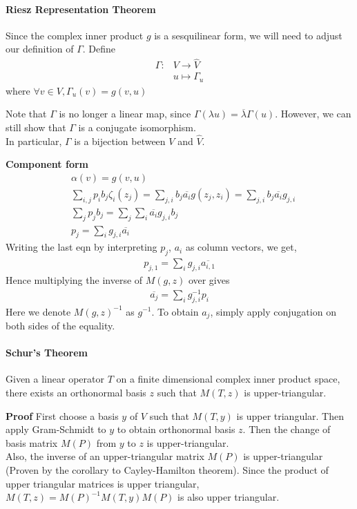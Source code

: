 \documentclass{article}
\begin{document}
\paragraph{Riesz Representation Theorem}
Since the complex inner product $g$ is a sesquilinear form, we will need to adjust our definition of $\Gamma$.
Define 
\begin{align*}
	\Gamma: &V\rightarrow \hat{V}\\
	&u\mapsto \Gamma_u
\end{align*}
where $\forall v\in V, \Gamma_u(v) = g(v, u)$

Note that $\Gamma$ is no longer a linear map, since $\Gamma(\lambda u) = \overline{\lambda}\Gamma(u)$.
However, we can still show that $\Gamma$ is a conjugate isomorphism.\\
In particular, $\Gamma$ is a bijection between $V$ and $\hat{V}$.

\textbf{Component form}
\begin{align*}
	&\alpha(v) = g(v,u)\\
	&\sum_{i,j}p_ib_j\zeta_i(z_j)=\sum_{j,i}b_j\overline{a_i}g(z_j,z_i)=\sum_{j,i}b_j\overline{a_i}g_{j,i}\\
	&\sum_j p_jb_j = \sum_j\sum_i \overline{a_i}g_{j,i} b_j\\
	&p_j = \sum_i g_{j,i}\overline{a_i}
\end{align*}
Writing the last eqn by interpreting $p_j$, $a_i$ as column vectors, we get,
\begin{align*}
	p_{j,1} = \sum_i g_{j,i}\overline{a_{i,1}}
\end{align*}
Hence multiplying the inverse of $M(g,z)$ over gives
\begin{align*}
	\overline{a_j}=\sum_i g^{-1}_{j,i}p_i
\end{align*}
Here we denote $M(g,z)^{-1}$ as $g^{-1}$. To obtain $a_j$, simply apply conjugation on both sides of the equality.
\paragraph{Schur's Theorem}
Given a linear operator $T$ on a finite dimensional complex inner product space, there exists an orthonormal basis $z$ such that $M(T,z)$ is upper-triangular.

\textbf{Proof} First choose a basis $y$ of $V$ such that $M(T,y)$ is upper triangular. Then apply Gram-Schmidt to $y$ to obtain orthonormal basis $z$. Then the change of basis matrix $M(P)$ from $y$ to $z$ is upper-triangular. \\
Also, the inverse of an upper-triangular matrix $M(P)$ is upper-triangular (Proven by the corollary to Cayley-Hamilton theorem). Since the product of upper triangular matrices is upper triangular, $M(T,z) = M(P)^{-1}M(T,y)M(P)$ is also upper triangular.
\end{document}

